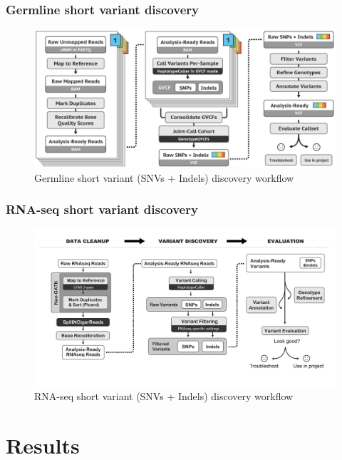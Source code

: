 \documentclass{beamer}
\begin{document}
    \begin{frame}
        \frametitle{Germline short variant discovery}

        \begin{figure}
            \includegraphics[width=0.7 \linewidth]{figures/Workflow/germline_short_variant.png}
            \caption{Germline short variant (SNVs + Indels) discovery workflow \protect\cite{gatk1, gatk2}}
        \end{figure}
    \end{frame}

    \begin{frame}
        \frametitle{RNA-seq short variant discovery}

        \begin{figure}
            \includegraphics[width=0.8 \linewidth]{figures/Workflow/RNA_short_variant.png}
            \caption{RNA-seq short variant (SNVs + Indels) discovery workflow \protect\cite{gatk1, gatk2}}
        \end{figure}
    \end{frame}

    \section{Results}
\end{document}

